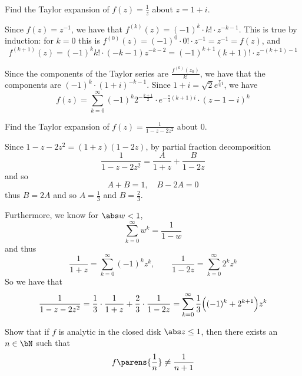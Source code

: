 \documentclass[10pt]{article}
\def\bexerc{\begin{exercise*}}
\def\eexerc{\end{exercise*}}
\def\bblank{\begin{blankpp}}
\def\eblank{\end{blankpp}}
\begin{document}


\bigskip

\bexerc

    Find the Taylor expansion of $f(z)=\frac1z$ about $z=1+i$.

\eexerc

\bblank

    Since $f(z)=z^{-1}$, we have that $f^{(k)}(z)=(-1)^k\cdot k!\cdot z^{-k-1}$.
    This is true by induction: for $k=0$ this is $f^{(0)}(z)=(-1)^0\cdot 0!\cdot z^{-1}=z^{-1}=f(z)$, and
    \[ f^{(k+1)}(z) = (-1)^k k!\cdot(-k-1)z^{-k-2} = (-1)^{k+1}(k+1)!\cdot z^{-(k+1)-1} \]

    Since the components of the Taylor series are $\frac{f^{(k)}(z_0)}{k!}$, we have that the components are $(-1)^k\cdot(1+i)^{-k-1}$.
    Since $1+i=\sqrt2 e^{\frac\pi4i}$, we have
    \[ f(z) = \sum_{k=0}^\infty (-1)^k2^{-\frac{k+1}2}\cdot e^{-\frac\pi4(k+1)i}\cdot(z-1-i)^k \]

\eblank

\bexerc

    Find the Taylor expansion of $f(z)=\frac1{1-z-2z^2}$ about $0$.

\eexerc

\bblank

    Since $1-z-2z^2=(1+z)(1-2z)$, by partial fraction decomposition
    \[ \frac1{1-z-2z^2} = \frac A{1+z} + \frac B{1-2z} \]
    and so
    \[ A + B = 1,\quad B - 2A = 0 \]
    thus $B=2A$ and so $A=\frac13$ and $B=\frac23$.

    Furthermore, we know for $\abs w<1$,
    \[ \sum_{k=0}^\infty w^k = \frac1{1-w} \]
    and thus
    \[ \frac1{1+z} = \sum_{k=0}^\infty (-1)^k z^k,\qquad \frac1{1-2z} = \sum_{k=0}^\infty 2^kz^k \]
    So we have that
    \[ \frac1{1-z-2z^2} = \frac13\cdot\frac1{1+z} + \frac23\cdot\frac1{1-2z} = \sum_{k=0}^\infty \frac13\Bigl((-1)^k + 2^{k+1}\Bigr)z^k \]

\eblank

\bexerc

    Show that if $f$ is analytic in the closed disk $\abs z\leq1$, then there exists an $n\in\bN$ such that
    \[ f\parens{\frac1n}\neq\frac1{n+1} \]

\eexerc
\end{document}
